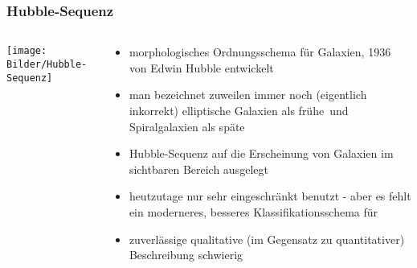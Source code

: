 \documentclass{beamer}
\begin{document}
\begin{frame}\frametitle{Hubble-Sequenz}

\begin{columns}

\begin{column}{.48\textwidth}

\texttt{[image: Bilder/Hubble-Sequenz]}

\end{column}

\hfill

\begin{column}{.48\textwidth}

\tiny
\begin{itemize}
\item morphologisches Ordnungsschema für Galaxien, 1936 von Edwin Hubble entwickelt
\item man bezeichnet zuweilen immer noch (eigentlich inkorrekt) elliptische Galaxien als \glqq frühe\grqq \ und Spiralgalaxien als \glqq späte\grqq
\item Hubble-Sequenz auf die Erscheinung von Galaxien im sichtbaren Bereich ausgelegt 
\item heutzutage nur sehr eingeschränkt benutzt - aber es fehlt ein moderneres, besseres Klassifikationsschema für
\item zuverlässige qualitative (im Gegensatz zu quantitativer) Beschreibung schwierig
\end{itemize}

\end{column}

\end{columns}

\end{frame}
\end{document}

